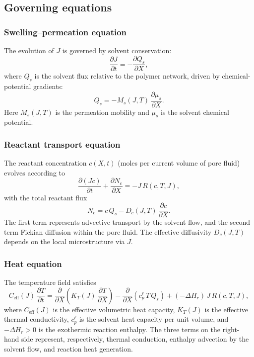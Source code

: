 \documentclass[aps,pre,reprint,superscriptaddress,longbibliography,floatfix]{revtex4-2}
\begin{document}
\subsection{Governing equations}

\subsubsection{Swelling--permeation equation}

The evolution of $J$ is governed by solvent conservation:
\begin{equation}
  \frac{\partial J}{\partial t} = -\frac{\partial Q_s}{\partial X},
  \label{eq:J_evol}
\end{equation}
where $Q_s$ is the solvent flux relative to the polymer network, driven by chemical-potential gradients:
\begin{equation}
  Q_s = -M_s(J,T)\,\frac{\partial \mu_s}{\partial X}.
  \label{eq:Qs}
\end{equation}
Here $M_s(J,T)$ is the permeation mobility and $\mu_s$ is the solvent chemical potential.

\subsubsection{Reactant transport equation}

The reactant concentration $c(X,t)$ (moles per current volume of pore fluid) evolves according to
\begin{equation}
  \frac{\partial (Jc)}{\partial t}
  + \frac{\partial N_c}{\partial X}
  = -J\,R(c,T,J),
  \label{eq:c_evol}
\end{equation}
with the total reactant flux
\begin{equation}
  N_c = c\,Q_s - D_c(J,T)\,\frac{\partial c}{\partial X}.
  \label{eq:Nc}
\end{equation}
The first term represents advective transport by the solvent flow, and the second term Fickian diffusion within the pore fluid. The effective diffusivity $D_c(J,T)$ depends on the local microstructure via $J$.

\subsubsection{Heat equation}

The temperature field satisfies
\begin{equation}
  C_\mathrm{eff}(J)\,\frac{\partial T}{\partial t}
  = \frac{\partial}{\partial X}\!\left(K_T(J)\,\frac{\partial T}{\partial X}\right)
  - \frac{\partial}{\partial X}\!\left(c_p^\ell\,T\,Q_s\right)
  + (-\Delta H_r)\,J\,R(c,T,J),
  \label{eq:T_evol}
\end{equation}
where $C_\mathrm{eff}(J)$ is the effective volumetric heat capacity, $K_T(J)$ is the effective thermal conductivity, $c_p^\ell$ is the solvent heat capacity per unit volume, and $-\Delta H_r > 0$ is the exothermic reaction enthalpy. The three terms on the right-hand side represent, respectively, thermal conduction, enthalpy advection by the solvent flow, and reaction heat generation.
\end{document}
